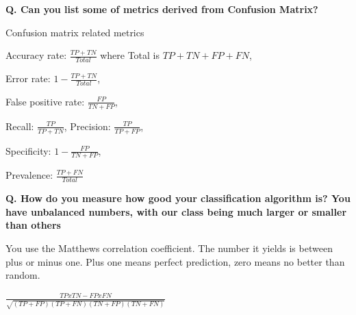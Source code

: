 \begin{frame}[fragile]{\textbf{Q. Can you list some of metrics derived from Confusion Matrix?}}
  \begin{wideitemize}
  \item Confusion matrix related metrics
    \begin{wideitemize}
    \item Accuracy rate: {\footnotesize $\frac{TP + TN}{Total}$}
      where {\footnotesize Total is $TP + TN + FP + FN$},\vspace{-.5em}
    \item Error rate: {\footnotesize $1 - \frac{TP + TN}{Total}$},\vspace{-.5em}
    \item False positive rate: {\footnotesize $\frac{FP}{TN + FP}$},\vspace{-.5em}
    \item Recall: {\footnotesize $\frac{TP}{TP + TN}$}, Precision: {\footnotesize $\frac{TP}{TP + FP}$},\vspace{-.5em}
    \item Specificity: {\footnotesize $1 - \frac{FP}{TN + FP}$},\vspace{-.5em}
    \item Prevalence: {\footnotesize $\frac{TP + FN}{Total}$}
    \end{wideitemize}
  \end{wideitemize}
\end{frame}

\begin{frame}[fragile]{\textbf{Q. How do you measure how  good your
      classification algorithm is? You have unbalanced numbers, with our class
      being much larger or smaller than others}}
  \begin{wideitemize}
  \item You use the Matthews correlation coefficient. The number it yields is
    between plus or minus one. Plus one means perfect prediction, zero means no
    better than random.
  \item $\frac{TP x TN - FP x FN}{\sqrt{(TP + FP)(TP + FN)(TN + FP)(TN + FN)}}$
  \end{wideitemize}
\end{frame}


